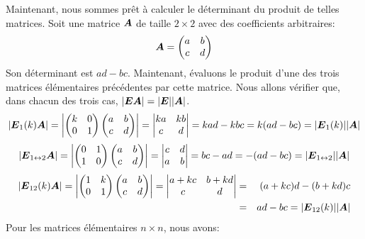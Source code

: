 Maintenant, nous sommes prêt à calculer le déterminant du produit de telles matrices.  Soit une matrice $\boldsymbol{A}$ de taille $2\times 2$ avec des coefficients arbitraires:
\[
\boldsymbol{A} = \begin{pmatrix}
a & b \\
c & d
\end{pmatrix}
\]
Son déterminant est $ad-bc$.  Maintenant, évaluons le produit d'une des trois matrices élémentaires précédentes par cette matrice. Nous allons vérifier que, dans chacun des trois cas, $|\boldsymbol{E} \boldsymbol{A}| = |\boldsymbol{E}| |\boldsymbol{A}|$.
\[
\left|\boldsymbol{E}_1(k) \boldsymbol{A} \right| =  \left|\begin{pmatrix}
k & 0 \\
0 & 1
\end{pmatrix}
\begin{pmatrix}
a & b \\
c & d
\end{pmatrix} \right|
= \begin{vmatrix}
ka & kb \\
c & d
\end{vmatrix} = kad - kbc = k(ad-bc) = |\boldsymbol{E}_1(k)| |\boldsymbol{A}|
\]
%
\[
\left|\boldsymbol{E}_{1\leftrightarrow 2} \boldsymbol{A} \right| =  \left|\begin{pmatrix}
0 & 1 \\
1 & 0
\end{pmatrix}
\begin{pmatrix}
a & b \\
c & d
\end{pmatrix} \right|
= \begin{vmatrix}
c & d \\
a & b
\end{vmatrix} = bc - ad = -(ad-bc) = |\boldsymbol{E}_{1\leftrightarrow 2} | |\boldsymbol{A}|
\]
%
\begin{eqnarray*}
\left|\boldsymbol{E}_{12}(k) \boldsymbol{A} \right| =  \left|\begin{pmatrix}
1 & k \\
0 & 1
\end{pmatrix}
\begin{pmatrix}
a & b \\
c & d
\end{pmatrix} \right|
= \begin{vmatrix}
a+kc & b+kd \\
c & d
\end{vmatrix} &=&(a+kc)d - (b+kd)c \\
 &=& ad-bc = |\boldsymbol{E}_{12}(k) | |\boldsymbol{A}|
\end{eqnarray*}
Pour les matrices élémentaires $n\times  n$, nous avons:
